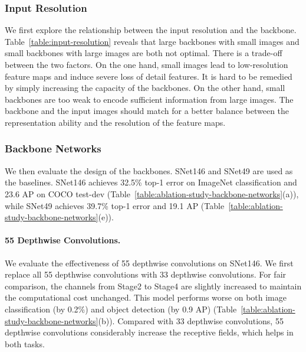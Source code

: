 \documentclass[10pt,twocolumn,letterpaper]{article}
\begin{document}
\subsubsection{Input Resolution}
\label{section:ablation-study-input-resolution}

We first explore the relationship between the input resolution and the backbone.
Table~\ref{table:input-resolution} reveals that large backbones with small images and small backbones with large images are both not optimal.
There is a trade-off between the two factors.
On the one hand, small images lead to low-resolution feature maps and induce severe loss of detail features.
It is hard to be remedied by simply increasing the capacity of the backbones.
On the other hand, small backbones are too weak to encode sufficient information from large images.
The backbone and the input images should match for a better balance between the representation ability and the resolution of the feature maps.




\vspace{-5pt}
\subsubsection{Backbone Networks}
\label{section:ablation-study-backbone-networks}

We then evaluate the design of the backbones.
SNet146 and SNet49 are used as the baselines.
SNet146 achieves 32.5\% top-1 error on ImageNet classification and 23.6 AP on COCO test-dev (Table~\ref{table:ablation-study-backbone-networks}(a)), while SNet49 achieves 39.7\% top-1 error and 19.1 AP (Table~\ref{table:ablation-study-backbone-networks}(e)).

\vspace{-12pt}
\paragraph{55 Depthwise Convolutions.}

We evaluate the effectiveness of 55 depthwise convolutions on SNet146.
We first replace all 55 depthwise convolutions with 33 depthwise convolutions.
For fair comparison, the channels from Stage2 to Stage4 are slightly increased to maintain the computational cost unchanged.
This model performs worse on both image classification (by 0.2\%) and object detection (by 0.9 AP) (Table~\ref{table:ablation-study-backbone-networks}(b)).
Compared with 33 depthwise convolutions, 55 depthwise convolutions considerably increase the receptive fields, which helps in both tasks.
\end{document}
